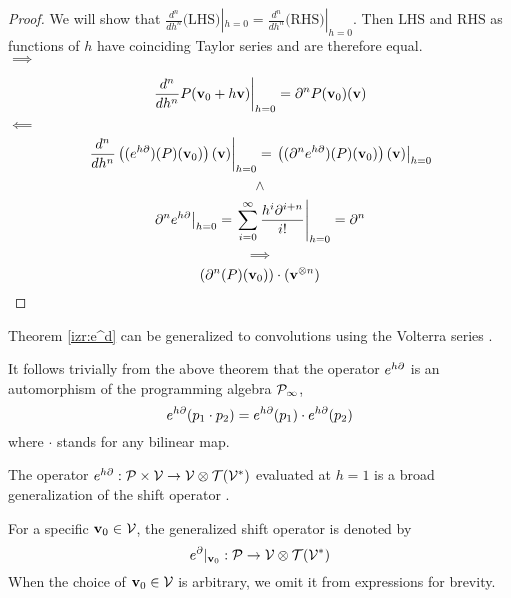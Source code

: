  \begin{proof}
We will show that $\frac{d^n}{dh^n}\text{(LHS)}|_{h=0}=\frac{d^n}{dh^n}\text{(RHS)}|_{h=0}$. Then $\text{LHS}$ and $\text{RHS}$ as functions
of $h$ have coinciding Taylor series and are therefore equal.\\
 $\implies$
 
 $$\left. \frac{d^n}{dh^n}P(\mathbf{v}_0+h\mathbf{v})\right|_{h=0}=\partial^n P(\mathbf{v}_0)(\mathbf{v})$$
 $\impliedby$
 $$\left. \frac{d^n}{dh^n}\left((e^{h\partial})(P)(\mathbf{v}_0)\right)(\mathbf{v})\right|_{h=0}=
\left. \left((\partial^n e^{h\partial})(P)(\mathbf{v}_0)\right)(\mathbf{v})\right|_{h=0}$$
 $$\land$$
 $$\left. \partial^ne^{h\partial}\right| _{h=0}=\left. \sum\limits_{i=0}^{\infty}\frac{h^i\partial^{i+n}}{i!}\right|_{h=0}=\partial^n$$
 $$\implies$$
 $$\left(\partial^n(P)(\mathbf{v}_0)\right)\cdot(\mathbf{v}^{\otimes n})$$
 \end{proof}
 \begin{remark}\label{konvVrst}
 Theorem \ref{izr:e^d} can be generalized to convolutions using the Volterra series \cite{volterra}.
 \end{remark}
It follows trivially from the above theorem that the operator $e^{h\partial}$ is an
automorphism of the programming algebra $\mathcal{P}_\infty$, 
\begin{equation}\label{eq:prod}
  e^{h\partial}(p_1\cdot p_2)=e^{h\partial}(p_1)\cdot e^{h\partial}(p_2)
 \end{equation}
 where $\cdot$ stands for any bilinear map.

 \begin{remark}\label{rmrk:genShift}
 The operator $e^{h\partial}:\mathcal{P}\times \mathcal{V}\to \mathcal{V}\otimes \mathcal{T}(\mathcal{V}^*)$ evaluated at $h=1$
 is a broad generalization of the shift operator \cite{OpCalc}.
 \end{remark}
 
 For a specific $\mathbf{v}_0\in\mathcal{V}$, the generalized shift operator is denoted by
 \begin{equation*}
 e^\partial\vert_{\mathbf{v}_0}:\mathcal{P}\to \mathcal{V}\otimes \mathcal{T}(\mathcal{V}^*)
 \end{equation*}
 When the choice of $\mathbf{v}_0\in\mathcal{V}$ is arbitrary, we omit it from expressions for brevity.


